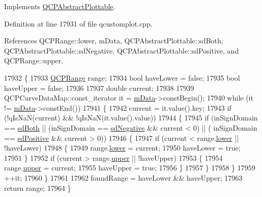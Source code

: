 Implements \hyperlink{class_q_c_p_abstract_plottable_a345d702b2e7e12c8cfdddff65ba85e8c}{Q\+C\+P\+Abstract\+Plottable}.



Definition at line 17931 of file qcustomplot.\+cpp.



References Q\+C\+P\+Range\+::lower, m\+Data, Q\+C\+P\+Abstract\+Plottable\+::sd\+Both, Q\+C\+P\+Abstract\+Plottable\+::sd\+Negative, Q\+C\+P\+Abstract\+Plottable\+::sd\+Positive, and Q\+C\+P\+Range\+::upper.


\begin{DoxyCode}
17932 \{
17933   \hyperlink{class_q_c_p_range}{QCPRange} range;
17934   \textcolor{keywordtype}{bool} haveLower = \textcolor{keyword}{false};
17935   \textcolor{keywordtype}{bool} haveUpper = \textcolor{keyword}{false};
17936   
17937   \textcolor{keywordtype}{double} current;
17938   
17939   QCPCurveDataMap::const\_iterator it = \hyperlink{class_q_c_p_curve_a88d533e455bca96004b049e99168731b}{mData}->constBegin();
17940   \textcolor{keywordflow}{while} (it != \hyperlink{class_q_c_p_curve_a88d533e455bca96004b049e99168731b}{mData}->constEnd())
17941   \{
17942     current = it.value().key;
17943     \textcolor{keywordflow}{if} (!qIsNaN(current) && !qIsNaN(it.value().value))
17944     \{
17945       \textcolor{keywordflow}{if} (inSignDomain == \hyperlink{class_q_c_p_abstract_plottable_a661743478a1d3c09d28ec2711d7653d8a082b98cfb91a7363a3b5cd17b0c1cd60}{sdBoth} || (inSignDomain == \hyperlink{class_q_c_p_abstract_plottable_a661743478a1d3c09d28ec2711d7653d8a0fc9a70796ef60ad18ddd18056e6dc63}{sdNegative} && current < 0) || (
      inSignDomain == \hyperlink{class_q_c_p_abstract_plottable_a661743478a1d3c09d28ec2711d7653d8a02951859f243a4d24e779cfbb5471030}{sdPositive} && current > 0))
17946       \{
17947         \textcolor{keywordflow}{if} (current < range.\hyperlink{class_q_c_p_range_aa3aca3edb14f7ca0c85d912647b91745}{lower} || !haveLower)
17948         \{
17949           range.\hyperlink{class_q_c_p_range_aa3aca3edb14f7ca0c85d912647b91745}{lower} = current;
17950           haveLower = \textcolor{keyword}{true};
17951         \}
17952         \textcolor{keywordflow}{if} (current > range.\hyperlink{class_q_c_p_range_ae44eb3aafe1d0e2ed34b499b6d2e074f}{upper} || !haveUpper)
17953         \{
17954           range.\hyperlink{class_q_c_p_range_ae44eb3aafe1d0e2ed34b499b6d2e074f}{upper} = current;
17955           haveUpper = \textcolor{keyword}{true};
17956         \}
17957       \}
17958     \}
17959     ++it;
17960   \}
17961   
17962   foundRange = haveLower && haveUpper;
17963   \textcolor{keywordflow}{return} range;
17964 \}
\end{DoxyCode}
\hypertarget{class_q_c_p_curve_aad0b69d9a7a2a5367fcc9fe3edaf9bf4}{}
